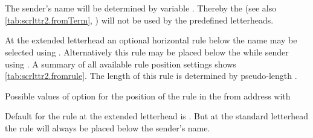%
%


\begin{Declaration}
  \\
    \\
\end{Declaration}
%
%
%
The sender's name will be determined by
variable . Thereby the  (see also
\autoref{tab:scrlttr2.fromTerm}, ) will not
be used by the predefined letterheads.

At the extended letterhead an
optional horizontal rule below the name may be selected using
.
Alternatively this rule may
be placed below the while sender using . A
summary of all available rule position settings shows
\autoref{tab:scrlttr2.fromrule}. The length of this rule is determined by
pseudo-length .

\begin{table}
  \caption[{Possible values of option  with
    }]{Possible values of option  for the
    position of the rule in the from address with
    }
  \label{tab:scrlttr2.fromrule}
  \begin{desctabular}
  \end{desctabular}
\end{table}

Default for the rule at the extended letterhead is . But at the
standard letterhead the rule will always be placed below the sender's name.

